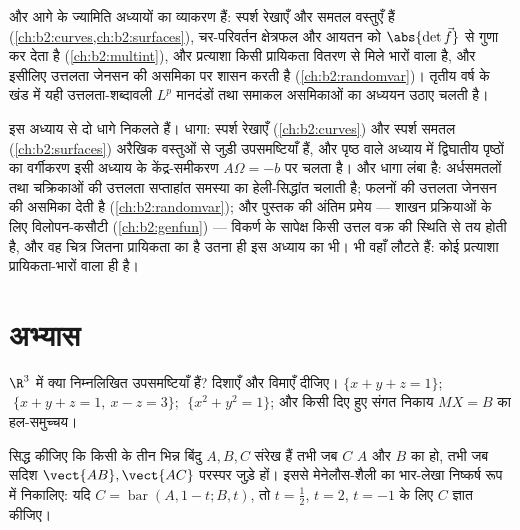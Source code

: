 \begin{remark}[आनत भाषा आगे कहाँ काम आती है]
 और  आगे के ज्यामिति अध्यायों का व्याकरण हैं:
स्पर्श रेखाएँ और समतल  वस्तुएँ हैं (\cref{ch:b2:curves,ch:b2:surfaces}),  चर-परिवर्तन क्षेत्रफल और
आयतन को $\abs{\det \vec f}$ से गुणा कर देता है (\cref{ch:b2:multint}), और प्रत्याशा किसी प्रायिकता वितरण
से मिले भारों वाला  है, और इसीलिए उत्तलता जेनसन की असमिका पर
शासन करती है (\cref{ch:b2:randomvar})। तृतीय वर्ष के खंड में यही उत्तलता-शब्दावली $L^p$
मानदंडों तथा समाकल असमिकाओं का अध्ययन उठाए चलती है।
\end{remark}

\begin{remark}[इसी खंड के भीतर के परिप्रेक्ष्य]
इस अध्याय से दो धागे निकलते हैं। \emph{} धागा: स्पर्श रेखाएँ (\cref{ch:b2:curves}) और
स्पर्श समतल (\cref{ch:b2:surfaces}) अरैखिक वस्तुओं से जुड़ी  उपसमष्टियाँ हैं, और पृष्ठ
वाले अध्याय में द्विघातीय पृष्ठों का वर्गीकरण इसी अध्याय के केंद्र-समीकरण
$A\Omega = -b$ पर चलता है। और \emph{} धागा लंबा है: अर्धसमतलों तथा चक्रिकाओं की
उत्तलता सप्ताहांत समस्या का हेली-सिद्धांत चलाती है; फलनों की उत्तलता जेनसन
की असमिका देती है (\cref{ch:b2:randomvar}); और पुस्तक की अंतिम प्रमेय --- शाखन प्रक्रियाओं
के लिए विलोपन-कसौटी (\cref{ch:b2:genfun}) --- विकर्ण के सापेक्ष किसी उत्तल वक्र की स्थिति
से तय होती है, और वह चित्र जितना प्रायिकता का है उतना ही इस अध्याय का भी।
 भी वहाँ लौटते हैं: कोई प्रत्याशा प्रायिकता-भारों वाला 
ही है।
\end{remark}

\section{अभ्यास}

\begin{exercise}[$\star$]\label{exo:b2:affine:1}
$\R^3$ में क्या निम्नलिखित  उपसमष्टियाँ हैं? दिशाएँ और विमाएँ दीजिए। $\{x + y + z = 1\}$;
$\;\{x + y + z = 1,\ x - z =
3\}$; $\;\{x^2 + y^2 = 1\}$; और किसी दिए हुए संगत निकाय $MX = B$ का हल-समुच्चय।
\end{exercise}

\begin{exercise}[$\star$]\label{exo:b2:affine:2}
सिद्ध कीजिए कि किसी  के तीन भिन्न बिंदु $A, B, C$ संरेख हैं तभी जब $C$
$A$ और $B$ का  हो, तभी जब सदिश $\vect{AB}, \vect{AC}$ परस्पर जुड़े हों। इससे
मेनेलौस-शैली का भार-लेखा निष्कर्ष रूप में निकालिए: यदि $C = \operatorname{bar}(A, 1 - t; B, t)$, तो $t = \frac12$, $t = 2$,
$t = -1$ के लिए $C$ ज्ञात कीजिए।
\end{exercise}

